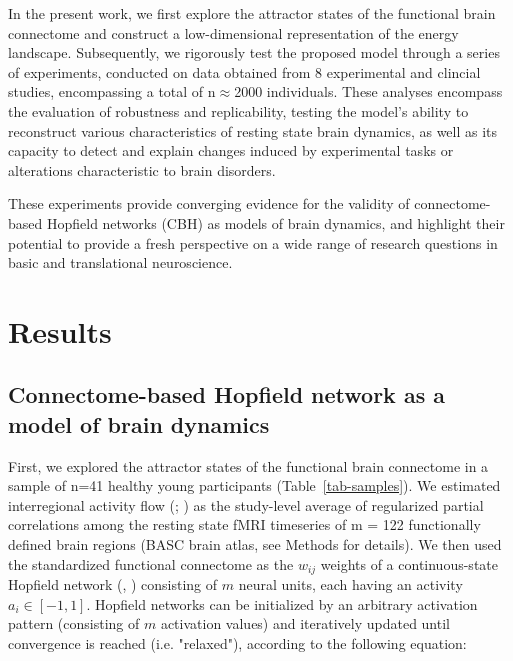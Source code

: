 \documentclass{article}
\begin{document}
In the present work, we first explore the attractor states of the functional brain connectome and construct a
low-dimensional representation of the energy landscape.
Subsequently, we rigorously test the proposed model through a series of experiments, conducted on data obtained
from 8 experimental and clincial studies, encompassing a total of n$\approx$2000 individuals.
These analyses encompass the evaluation of robustness and replicability, testing the model's ability to reconstruct
various characteristics of resting state brain dynamics, as well as its capacity to detect and explain changes induced
by experimental tasks or alterations characteristic to brain disorders.

These experiments provide converging evidence for the validity of connectome-based Hopfield networks (CBH) as models
of brain dynamics, and highlight their potential to provide a fresh perspective on a wide range of research questions
in basic and translational neuroscience.

\section{Results}\label{Results}

\subsection{Connectome-based Hopfield network as a model of brain dynamics}\label{Connectome-based Hopfield network as a model of brain dynamics}

First, we explored the attractor states of the functional brain connectome in a sample of n=41 healthy young participants (Table~\ref{tab-samples}).
We estimated interregional activity flow (\cite{Cole_2016}; \href{https://doi.org/10.1038/s41467-017-01000-w}{}) as the study-level average of regularized partial correlations among the resting state fMRI timeseries of m = 122 functionally defined brain regions (BASC brain atlas, see Methods for details).
We then used the standardized functional connectome as the $w_{ij}$  weights of a continuous-state Hopfield network (\href{https://doi.org/10.1073/pnas.79.8.2554}{}, \href{https://doi.org/10.1162/neco.1994.6.3.459}{}) consisting of $m$ neural units, each having an activity $a_i \in [ -1,1]$.
Hopfield networks can be initialized by an arbitrary activation pattern (consisting of $m$ activation values) and iteratively updated until convergence is reached (i.e. "relaxed"), according to the following equation:
\end{document}
